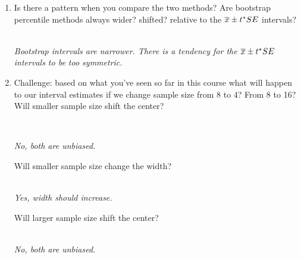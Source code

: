 \begin{enumerate}
\begin{enumerate}
\begin{students}
        \vspace{1cm}        
\end{students}
\begin{key}
 {\it AWV, $24.125 \pm  3.50 \times 5.31 = ( 5.5, 42.7)$\\
     Bootstrap: (11.3, 36.9)}
\end{key}
\end{enumerate}
\item Is there a pattern when you compare the two methods?  Are
  bootstrap percentile methods always wider? shifted? relative to the 
 $\overline{x} \pm t^* SE$ intervals?
\begin{students}
        \vspace{1cm}        
\end{students}
\begin{key}
  \\ {\it Bootstrap intervals are narrower.  There is a tendency for
    the $\overline{x} \pm t^* SE$ intervals to be   too symmetric. }
\end{key}

\item Challenge: based on what you've seen so far in this course what
  will happen to our interval estimates if we 
  change  sample size from 8 to  4?  From 8 to 16?\\
   Will smaller sample size shift the center?
\begin{students}
        \vspace{.5cm}        \\
\end{students}
\begin{key}
{\it No, both are unbiased.}
\end{key}

Will smaller sample size change the width?
\begin{students}
        \vspace{.5cm}        
\end{students}
\begin{key}
\\{\it Yes, width should increase.}
\end{key}

   Will larger sample size shift the center?
\begin{students}
        \vspace{.5cm}        
\end{students}
\begin{key}
\\{\it No, both are unbiased.}
\end{key}


\end{enumerate}
